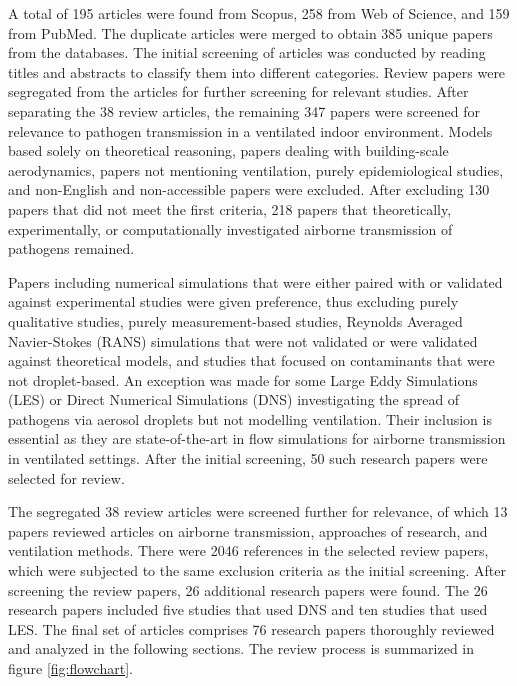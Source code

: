 \documentclass[a4paper,12pt]{elsarticle}
\begin{document}
A total of 195 articles were found from Scopus, 258 from Web of Science, and 159 from PubMed. The duplicate articles were merged to obtain 385 unique papers from the databases. The initial screening of articles was conducted by reading titles and abstracts to classify them into different categories. Review papers were segregated from the articles for further screening for relevant studies. After separating the 38 review articles, the remaining 347 papers were screened for relevance to pathogen transmission in a ventilated indoor environment. Models based solely on theoretical reasoning, papers dealing with building-scale aerodynamics, papers not mentioning ventilation, purely epidemiological studies, and non-English and non-accessible papers were excluded. After excluding 130 papers that did not meet the first criteria, 218 papers that theoretically, experimentally, or computationally investigated airborne transmission of pathogens remained.

Papers including numerical simulations that were either paired with or validated against experimental studies were given preference, thus excluding purely qualitative studies, purely measurement-based studies, Reynolds Averaged Navier-Stokes (RANS) simulations that were not validated or were validated against theoretical models, and studies that focused on contaminants that were not droplet-based. An exception was made for some Large Eddy Simulations (LES) or Direct Numerical Simulations (DNS) investigating the spread of pathogens via aerosol droplets but not modelling ventilation. Their inclusion is essential as they are state-of-the-art in flow simulations for airborne transmission in ventilated settings. After the initial screening, 50 such research papers were selected for review.

The segregated 38 review articles were screened further for relevance, of which 13 papers reviewed articles on airborne transmission, approaches of research, and ventilation methods. There were 2046 references in the selected review papers, which were subjected to the same exclusion criteria as the initial screening. After screening the review papers, 26 additional research papers were found. The 26 research papers included five studies that used DNS and ten studies that used LES. The final set of articles comprises 76 research papers thoroughly reviewed and analyzed in the following sections. The review process is summarized in figure \ref{fig:flowchart}.
\end{document}
